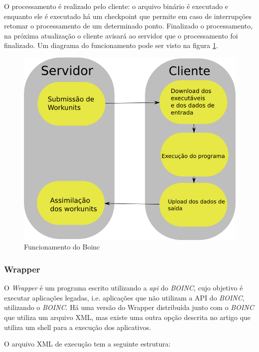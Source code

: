 O processamento é realizado pelo cliente: o arquivo binário é executado e enquanto ele é executado há um checkpoint
que permite em caso de interrupções retomar o processamento de um determinado ponto. Finalizado o processamento, 
na próxima atualização o cliente avisará ao servidor que o processamento foi finalizado. Um diagrama do funcionamento pode
ser visto na figura \ref{funcionamento-boinc}. 


\begin{figure}[!h]
  \includegraphics[scale=0.5]{boinc-schema.png}
  \caption{Funcionamento do Boinc}
  \label{funcionamento-boinc}
\end{figure}


\subsubsection{Wrapper}


O \emph{Wrapper} é um programa escrito utilizando a \emph{api} do \emph{BOINC}, cujo objetivo é executar aplicações legadas, 
i.e. aplicações que não utilizam a API do \emph{BOINC}, utilizando o \textit{BOINC}. Há uma versão do Wrapper distribuída junto com o 
\textit{BOINC} que utiliza um arquivo XML, mas existe uma outra opção descrita no artigo %
que utiliza um shell para a execução dos aplicativos.

O arquivo XML de execução tem a seguinte estrutura:

